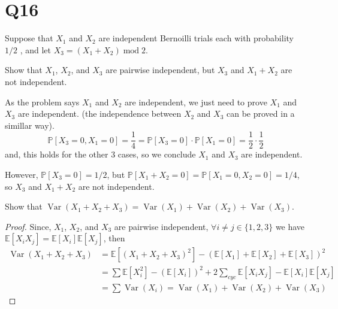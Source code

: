 \documentclass[11pt]{article}
\begin{document}
\section*{Q16}
Suppose that $X_1$ and $X_2$ are independent Bernoilli trials each 
with probability $1 /2$ , and let $X_3=(X_1+X_2) \operatorname{mod} 2$.
\begin{qparts}

\item Show that $X_1$, $X_2$, and $X_3$ are pairwise independent, but 
$X_3$ and $X_1+X_2$ are not independent.
\begin{solution}
    As the problem says $X_1$ and $X_2$ are independent, we just need to prove $X_1$ and $X_3$ are independent. (the independence between 
    $X_2$ and $X_3$ can be proved in a simillar way).
    \begin{equation*}
      \mathbb{P}\left[ X_3 =0,X_1=0 \right]=\frac{1}{4}=\mathbb{P}\left[ X_3=0 \right]\cdot \mathbb{P}\left[ X_1=0 \right]=\frac{1}{2}\cdot \frac{1}{2}   
    \end{equation*}
    and, this holds for the other 3 cases, so we conclude $X_1$ and $X_3$ 
    are independent.

    However, $\mathbb{P}\left[ X_3=0 \right] =1 / 2$, but $\mathbb{P}\left[ X_1 +X_2=0\right]=\mathbb{P}\left[ X_1=0,X_2=0 \right]=1 / 4  $, so 
    $X_3$ and $X_1+X_2$ are not independent.
\end{solution}

\item Show that $\operatorname{Var}\left( X_1+X_2+X_3 \right)=
\operatorname{Var}(X_1)+\operatorname{Var}(X_2)
+\operatorname{Var}(X_3)$.
\begin{proof}
    Since, $X_1$, $X_2$, and $X_3$ are pairwise independent, $\forall i\neq j \in \{ 1,2,3 \}$ we have $
    \mathbb{E}\left[ X_{i}X_j \right]=\mathbb{E}\left[ X_{i} \right]\mathbb{E}\left[ X_j \right]   $, then 
    \begin{align*}
      \operatorname{Var}(X_1+X_2+X_3)&=\mathbb{E}\left[ 
        (X_1+X_2+X_3)^{2}
       \right] 
       -(\mathbb{E}\left[ X_1 \right]+\mathbb{E}\left[ X_2 \right] 
       +\mathbb{E}\left[ X_3 \right]  )^{2}\\
       &=\sum\mathbb{E}\left[ X_{i}^{2} \right] -(\mathbb{E}\left[ X_{i} \right] )^{2}+
       2\sum_{cyc}\mathbb{E}\left[ X_{i}X_j \right]-
       \mathbb{E}\left[ X_{i} \right] \mathbb{E}\left[ X_j \right] \\
       &=\sum\operatorname{Var}(X_{i})=\operatorname{Var}(X_1)+
       \operatorname{Var}(X_2)+\operatorname{Var}(X_3)
    \end{align*}
\end{proof}
\end{qparts}
\end{document}
